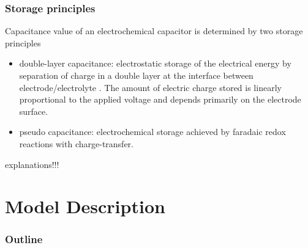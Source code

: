 \documentclass[10pt,xcolor=dvipsnames,compress]{beamer}
\begin{document}
\begin{frame}
\frametitle{Storage principles}
\vfill

Capacitance value of an electrochemical capacitor is determined by two storage principles
\begin{itemize}
\item double-layer capacitance: electrostatic storage of the electrical energy
by separation of charge in a double layer at the interface between electrode/electrolyte .
The amount of electric charge stored is linearly proportional to the applied voltage and depends primarily on the electrode surface.
\item pseudo capacitance: electrochemical storage achieved by faradaic redox reactions with charge-transfer.
\end{itemize}

\begin{block}{}
explanations!!!
\end{block}


\vfill
\end{frame}


\section{Model Description}
\begin{frame}
\frametitle{Outline}
\vfill

\vspace{0.7in}
\vspace{0.7in}

\vfill
\end{frame}
\end{document}

